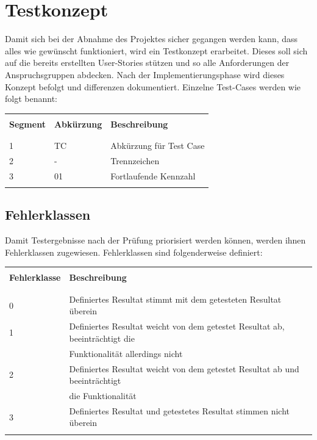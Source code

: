 \section{Testkonzept}
Damit sich bei der Abnahme des Projektes sicher gegangen werden kann, dass alles wie gewünscht funktioniert, wird ein Testkonzept erarbeitet. Dieses soll sich auf die bereits erstellten User-Stories stützen und so alle Anforderungen der Anspruchsgruppen abdecken. Nach der Implementierungsphase wird dieses Konzept befolgt und differenzen dokumentiert.
\newline
Einzelne Test-Cases werden wie folgt benannt:
\begin{table}[H]
  \begin{tabularx}{\textwidth}{l l X}\hline \\
  \textbf{Segment} & \textbf{Abkürzung} & \textbf{Beschreibung} \\ \\\hline \\
  1 & TC & Abkürzung für Test Case \\
  2 & - & Trennzeichen \\
  3 & 01 & Fortlaufende Kennzahl \\
  \\\hline
  \end{tabularx}
\end{table}
\subsection{Fehlerklassen}
Damit Testergebnisse nach der Prüfung priorisiert werden können, werden ihnen Fehlerklassen zugewiesen.
Fehlerklassen sind folgenderweise definiert:
\begin{table}[H]
  \begin{tabularx}{\textwidth}{l l X}\hline \\
  \textbf{Fehlerklasse} & \textbf{Beschreibung} \\ \\\hline \\
  0 & Definiertes Resultat stimmt mit dem getesteten Resultat überein \\
  1 & Definiertes Resultat weicht von dem getestet Resultat ab, beeinträchtigt die \\
    & Funktionalität allerdings nicht \\
  2 & Definiertes Resultat weicht von dem getestet Resultat ab und beeinträchtigt \\
    & die Funktionalität \\
  3 & Definiertes Resultat und getestetes Resultat stimmen nicht überein \\
  \\\hline
  \end{tabularx}
\end{table}
